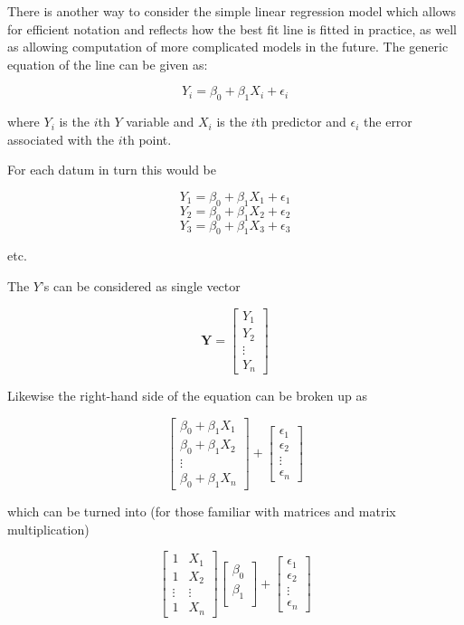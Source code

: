 \documentclass[
  oneside]{krantz}
\begin{document}
There is another way to consider the simple linear regression model which allows for efficient notation and reflects how the best fit line is fitted in practice, as well as allowing computation of more complicated models in the future. The generic equation of the line can be given as:

\[ Y_i = \beta_0+\beta_1 X_i + \epsilon_i \]

where \(Y_i\) is the \(i\)th \(Y\) variable and \(X_i\) is the \(i\)th predictor and \(\epsilon_i\) the error associated with the \(i\)th point.

For each datum in turn this would be

\[ Y_1 = \beta_0+\beta_1 X_1 + \epsilon_1 \]
\[ Y_2 = \beta_0+\beta_1 X_2 + \epsilon_2 \]
\[ Y_3 = \beta_0+\beta_1 X_3 + \epsilon_3 \]

etc.

The \(Y\)'s can be considered as single vector

\[
\mathbf{Y} = \left[\begin{array}
{r}
Y_1  \\
Y_2  \\
\vdots\\
Y_n
\end{array}\right]
\]

Likewise the right-hand side of the equation can be broken up as

\[
\left[\begin{array}
{r}
\beta_0 + \beta_1 X_1 \\
 \beta_0 + \beta_1 X_2 \\  
\vdots \\
\beta_0+\beta_1 X_n
\end{array}\right] +
\left[\begin{array}
{r}
\epsilon_1 \\
 \epsilon_2 \\  
\vdots\\
\epsilon_n
\end{array}\right]
\]

which can be turned into (for those familiar with matrices and matrix multiplication)

\[
\left[\begin{array}
{rr}
1 & X_1 \\
1 & X_2 \\  
\vdots & \vdots\\
1 & X_n
\end{array}\right] 
\left[\begin{array}
{r}
\beta_0 \\
\beta_1 \\  
\end{array}\right] +
\left[\begin{array}
{r}
\epsilon_1 \\
\epsilon_2 \\  
\vdots\\
\epsilon_n
\end{array}\right]
\]
\end{document}
